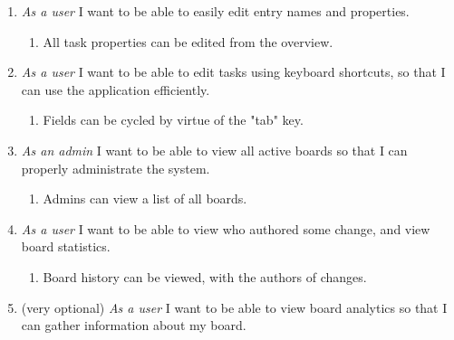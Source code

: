 \documentclass{article}
\begin{document}
	\begin{enumerate}
		\item \emph{As a user} I want to be able to easily edit entry names and properties.
			\begin{enumerate}
				\item All task properties can be edited from the overview.
			\end{enumerate}
		\begin{center}
		\end{center}
		\item \emph{As a user} I want to be able to edit tasks using keyboard shortcuts, so that I can use the application efficiently.
			\begin{enumerate}
				\item Fields can be cycled by virtue of the "tab" key.
			\end{enumerate}
		\item \emph{As an admin} I want to be able to view all active boards so that I can properly administrate the system.
			\begin{enumerate}
				\item Admins can view a list of all boards.
			\end{enumerate}
		\item \emph{As a user} I want to be able to view who authored some change, and view board statistics.
			\begin{enumerate}
				\item Board history can be viewed, with the authors of changes.
			\end{enumerate}
		\item (very optional) \emph{As a user} I want to be able to view board analytics so that I can gather information about my board.

\end{enumerate}
\end{document}
